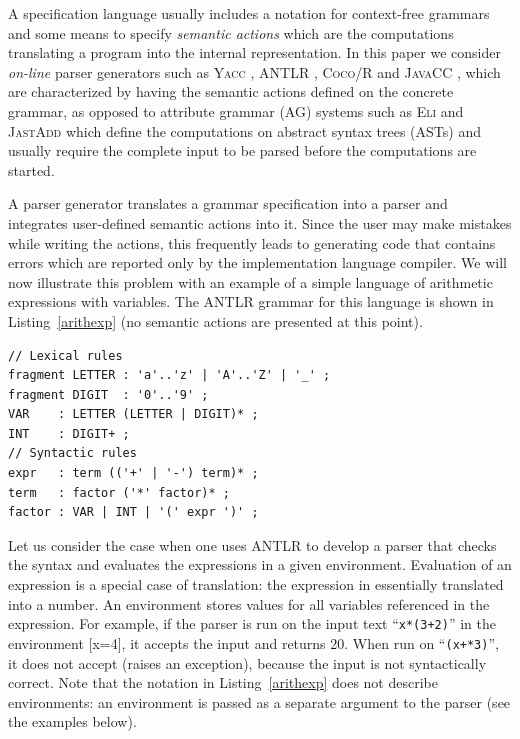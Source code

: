 \documentclass{llncs2e/llncs}
\newcommand{\lstref}[1]{Listing~\ref{#1}}
\newcommand{\tool}[1]{\textsc{#1}}
\begin{document}
A specification language usually includes a notation for context-free grammars and some means to specify \emph{semantic actions} which are the computations translating a program into the internal representation. In this paper we consider \emph{on-line} parser generators such as \tool{Yacc} \cite{YACC}, \tool{ANTLR} \cite{ANTLR}, \tool{Coco/R} \cite{Coco/R} and \tool{JavaCC} \cite{JavaCC}, which are characterized by having the semantic actions defined on the concrete grammar, as opposed to attribute grammar (AG) systems such as \tool{Eli} \cite{Eli} and \tool{JastAdd} \cite{JastAdd} which define the computations on abstract syntax trees (ASTs) and usually require the complete input to be parsed before the computations are started. 

A parser generator translates a grammar specification into a parser and integrates user-defined semantic actions into it.
Since the user may make mistakes while writing the actions, this frequently leads to generating code that contains errors which are reported only by the implementation language compiler. We will now illustrate this problem with an example of a simple language of arithmetic expressions with variables. The \tool{ANTLR} grammar for this language is shown in \lstref{arithexp} (no semantic actions are presented at this point). 
\begin{lstlisting}[label=arithexp,caption=An ANTLR grammar for arithmetic expressions]
// Lexical rules
fragment LETTER : 'a'..'z' | 'A'..'Z' | '_' ;
fragment DIGIT  : '0'..'9' ;
VAR    : LETTER (LETTER | DIGIT)* ;
INT    : DIGIT+ ;
// Syntactic rules
expr   : term (('+' | '-') term)* ;
term   : factor ('*' factor)* ;
factor : VAR | INT | '(' expr ')' ;
\end{lstlisting}

Let us consider the case when one uses \tool{ANTLR} to develop a parser that checks the syntax and evaluates the expressions in a given environment. Evaluation of an expression is a special case of translation: the expression in essentially translated into a number. An environment stores values for all variables referenced in the expression. For example, if the parser is run on the input text ``\texttt{x*(3+2)}'' in the environment [x=4], it accepts the input and returns 20. When run on ``\texttt{(x+*3)}'', it does not accept (raises an exception), because the input is not syntactically correct. 
Note that the notation in \lstref{arithexp} does not describe environments: an environment is passed as a separate argument to the parser (see the examples below). 
\end{document}

